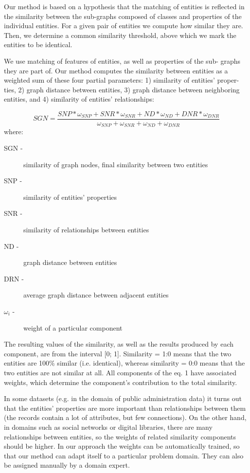 \documentclass{llncs}
\begin{document}
Our method is based on a hypothesis that the matching of entities is reflected
in the similarity between the sub-graphs composed of classes and properties of
the individual entities. For a given pair of entities we compute how similar they
are. Then, we determine a common similarity threshold, above which we mark
the entities to be identical.

We use matching of features of entities, as well as properties of the sub-
graphs they are part of. Our method computes the similarity between entities as
a weighted sum of these four partial parameters: 1) similarity of entities' proper-
ties, 2) graph distance between entities, 3) graph distance between neighboring
entities, and 4) similarity of entities' relationships:

$$ SGN = \frac{SNP * \omega_{SNP} + SNR * \omega_{SNR} + ND * \omega_{ND} + DNR * \omega_{DNR}}{\omega_{SNP} + \omega_{SNR} + \omega_{ND} + \omega_{DNR}} $$
where:

\begin{description}
\item[\textsc{SGN} - ]similarity of graph nodes, final similarity between two entities
\item[\textsc{SNP} - ]similarity of entities' properties
\item[\textsc{SNR} - ]similarity of relationships between entities
\item[\textsc{ND} - ]graph distance between entities
\item[\textsc{DRN} - ]average graph distance between adjacent entities
\item[$\omega_i$ - ]weight of a particular component
\end{description}
The resulting values of the similarity, as well as the results produced by each
component, are from the interval [0; 1]. Similarity = 1:0 means that the two
entities are 100\% similar (i.e. identical), whereas similarity = 0:0 means that the
two entities are not similar at all. All components of the eq. 1 have associated
weights, which determine the component's contribution to the total similarity.

In some datasets (e.g. in the domain of public administration data) it turns
out that the entities' properties are more important than relationships between
them (the records contain a lot of attributes, but few connections). On the other
hand, in domains such as social networks or digital libraries, there are many
relationships between entities, so the weights of related similarity components
should be higher. In our approach the weights can be automatically trained, so
that our method can adapt itself to a particular problem domain. They can also
be assigned manually by a domain expert.
\end{document}
